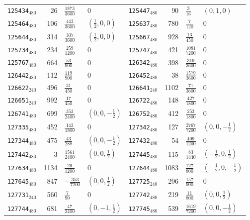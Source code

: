 {\begin{longtable}{@{}lrll@{\hspace{2em}}lrll@{}}
\texttt{125434}$_{480}$ & 26 & $\tfrac{1873}{3600}$ & 0 & \texttt{125447}$_{480}$ & 90 & $\tfrac{3}{16}$ & $(0,1,0)$\\
\texttt{125464}$_{480}$ & 106 & $\tfrac{443}{3600}$ & $(\tfrac{1}{2},0,0)$ & \texttt{125637}$_{480}$ & 780 & $\tfrac{7}{120}$ & 0\\
\texttt{125644}$_{480}$ & 314 & $\tfrac{307}{3600}$ & $(\tfrac{1}{2},0,0)$ & \texttt{125667}$_{480}$ & 928 & $\tfrac{13}{450}$ & 0\\
\texttt{125734}$_{480}$ & 234 & $\tfrac{259}{1200}$ & 0 & \texttt{125747}$_{480}$ & 421 & $\tfrac{1081}{7200}$ & 0\\
\texttt{125767}$_{480}$ & 664 & $\tfrac{53}{900}$ & 0 & \texttt{126342}$_{480}$ & 398 & $\tfrac{319}{3600}$ & 0\\
\texttt{126442}$_{480}$ & 112 & $\tfrac{119}{900}$ & 0 & \texttt{126452}$_{480}$ & 38 & $\tfrac{1579}{3600}$ & 0\\
\texttt{126622}$_{240}$ & 496 & $\tfrac{31}{450}$ & 0 & \texttt{126641}$_{240}$ & 1102 & $\tfrac{71}{3600}$ & 0\\
\texttt{126651}$_{240}$ & 992 & $\tfrac{17}{450}$ & 0 & \texttt{126722}$_{480}$ & 148 & $\tfrac{427}{1800}$ & 0\\
\texttt{126741}$_{480}$ & 699 & $\tfrac{353}{2400}$ & $(0,0,-\tfrac{1}{2})$ & \texttt{126752}$_{480}$ & 412 & $\tfrac{253}{1800}$ & 0\\
\texttt{127335}$_{480}$ & 452 & $\tfrac{143}{1800}$ & 0 & \texttt{127342}$_{480}$ & 127 & $\tfrac{2767}{7200}$ & $(0,0,-\tfrac{1}{2})$\\
\texttt{127344}$_{480}$ & 475 & $\tfrac{43}{288}$ & $(0,0,-\tfrac{1}{2})$ & \texttt{127432}$_{480}$ & 54 & $\tfrac{409}{1200}$ & 0\\
\texttt{127442}$_{480}$ & 3 & $\tfrac{1561}{2400}$ & $(0,0,\tfrac{1}{2})$ & \texttt{127445}$_{480}$ & 115 & $\tfrac{83}{1440}$ & $(-\tfrac{1}{2},0,\tfrac{1}{2})$\\
\texttt{127634}$_{480}$ & 1134 & $\tfrac{29}{1200}$ & 0 & \texttt{127644}$_{480}$ & 1083 & $\tfrac{127}{800}$ & $(-\tfrac{1}{2},0,-\tfrac{1}{2})$\\
\texttt{127645}$_{480}$ & 847 & $-\tfrac{353}{7200}$ & $(0,0,\tfrac{1}{2})$ & \texttt{127725}$_{240}$ & 296 & $\tfrac{157}{900}$ & 0\\
\texttt{127731}$_{240}$ & 560 & $\tfrac{7}{90}$ & 0 & \texttt{127742}$_{480}$ & 219 & $\tfrac{11}{800}$ & $(0,0,\tfrac{1}{2})$\\
\texttt{127744}$_{480}$ & 681 & $\tfrac{47}{2400}$ & $(0,-1,\tfrac{1}{2})$ & \texttt{127745}$_{480}$ & 539 & $\tfrac{1619}{7200}$ & $(0,0,-\tfrac{1}{2})$\\

\end{longtable}}
